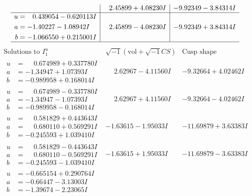 \documentclass[1p]{elsarticle_modified}
\theoremstyle{definition}
\newcommand{\I}{\sqrt{-1}}
\begin{document}
$$\begin{array}{c|c|c}
 & \phantom{-}2.45899 + 4.08230 I & -9.92349 - 3.84314 I \\ \hline\begin{aligned}
u &= \phantom{-}0.439054 - 0.620113 I \\
a &= -1.40227 - 1.08942 I \\
b &= -1.066550 + 0.215001 I\end{aligned}
 & \phantom{-}2.45899 - 4.08230 I & -9.92349 + 3.84314 I\\
 \hline 
 \end{array}$$\newpage$$\begin{array}{c|c|c}  
\text{Solutions to }I^u_{1}& \I (\text{vol} + \sqrt{-1}CS) & \text{Cusp shape}\\
 \hline 
\begin{aligned}
u &= \phantom{-}0.674989 + 0.337780 I \\
a &= -1.34947 + 1.07393 I \\
b &= -0.989958 + 0.168014 I\end{aligned}
 & \phantom{-}2.62967 - 4.11560 I & -9.32664 + 4.02462 I \\ \hline\begin{aligned}
u &= \phantom{-}0.674989 - 0.337780 I \\
a &= -1.34947 - 1.07393 I \\
b &= -0.989958 - 0.168014 I\end{aligned}
 & \phantom{-}2.62967 + 4.11560 I & -9.32664 - 4.02462 I \\ \hline\begin{aligned}
u &= \phantom{-}0.581829 + 0.443643 I \\
a &= \phantom{-}0.680110 + 0.569291 I \\
b &= -0.245593 + 1.039410 I\end{aligned}
 & -1.63615 - 1.95033 I & -11.69879 + 3.63383 I \\ \hline\begin{aligned}
u &= \phantom{-}0.581829 - 0.443643 I \\
a &= \phantom{-}0.680110 - 0.569291 I \\
b &= -0.245593 - 1.039410 I\end{aligned}
 & -1.63615 + 1.95033 I & -11.69879 - 3.63383 I \\ \hline\begin{aligned}
u &= -0.665154 + 0.290764 I \\
a &= -0.66447 - 3.13003 I \\
b &= -1.39674 - 2.23065 I\end{aligned}

\end{array}$$
\end{document}
